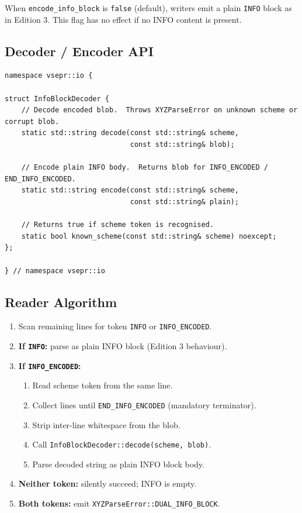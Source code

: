 \documentclass[12pt, a4paper, oneside]{article}
\newcommand{\type}[1]{\texttt{#1}}
\begin{document}
When \texttt{encode\_info\_block} is \texttt{false} (default), writers emit
a plain \texttt{INFO} block as in Edition 3.  This flag has no effect if no
INFO content is present.

\subsection{Decoder / Encoder API}

\begin{lstlisting}
namespace vsepr::io {

struct InfoBlockDecoder {
    // Decode encoded blob.  Throws XYZParseError on unknown scheme or corrupt blob.
    static std::string decode(const std::string& scheme,
                              const std::string& blob);

    // Encode plain INFO body.  Returns blob for INFO_ENCODED / END_INFO_ENCODED.
    static std::string encode(const std::string& scheme,
                              const std::string& plain);

    // Returns true if scheme token is recognised.
    static bool known_scheme(const std::string& scheme) noexcept;
};

} // namespace vsepr::io
\end{lstlisting}

\subsection{Reader Algorithm}

\begin{enumerate}
  \item Scan remaining lines for token \texttt{INFO} or \texttt{INFO\_ENCODED}.
  \item \textbf{If \texttt{INFO}:} parse as plain INFO block (Edition 3 behaviour).
  \item \textbf{If \texttt{INFO\_ENCODED}:}
    \begin{enumerate}
      \item Read scheme token from the same line.
      \item Collect lines until \texttt{END\_INFO\_ENCODED} (mandatory terminator).
      \item Strip inter-line whitespace from the blob.
      \item Call \type{InfoBlockDecoder::decode(scheme, blob)}.
      \item Parse decoded string as plain INFO block body.
    \end{enumerate}
  \item \textbf{Neither token:} silently succeed; INFO is empty.
  \item \textbf{Both tokens:} emit \type{XYZParseError::DUAL\_INFO\_BLOCK}.
\end{enumerate}
\end{document}
